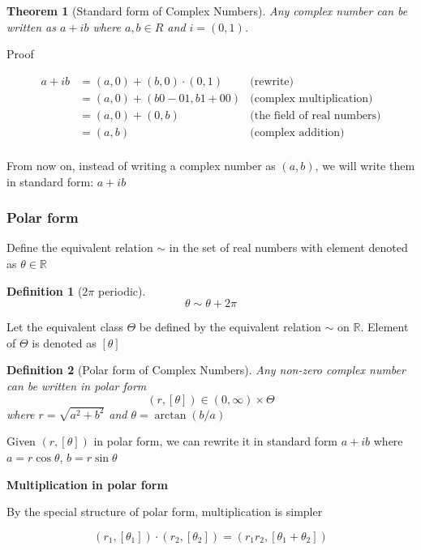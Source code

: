 \documentclass{article}
\newtheorem{theorem}{Theorem}
\newtheorem{definition}{Definition}
\begin{document}
\begin{theorem}[Standard form of Complex Numbers]
    Any complex number can be written as $a + ib$ where $a, b \in R$ and $i = (0, 1)$.
\end{theorem}

Proof

\begin{align*}
    a + ib  &= (a, 0) + (b, 0) \cdot (0, 1) &\text{(rewrite)}\\
            &= (a, 0) + (b 0 - 0 1, b 1 + 0 0) &\text{(complex multiplication)}\\
            &= (a, 0) + (0, b) &\text{(the field of real numbers)}\\
            &= (a, b) &\text{(complex addition)}\\
\end{align*}

From now on, instead of writing a complex number as $(a, b)$, we will write them in standard form: $a + ib$

\subsubsection{Polar form}

Define the equivalent relation $\sim$ in the set of real numbers with element denoted as $\theta \in \mathbb{R}$

\begin{definition}[$2\pi$ periodic]
$$
    \theta \sim \theta + 2\pi 
$$
\end{definition}

Let the equivalent class $\Theta$ be defined by the equivalent relation $\sim$ on $\mathbb{R}$. Element of $\Theta$ is denoted as $[\theta]$

\begin{definition}[Polar form of Complex Numbers]
    Any non-zero complex number can be written in polar form
$$
    (r, [\theta]) \in (0, \infty) \times \Theta
$$
    where $r = \sqrt{a^2 + b^2}$ and $\theta = \arctan (b/a)$
\end{definition}

Given $(r, [\theta])$ in polar form, we can rewrite it in standard form $a + ib$ where $a = r \cos \theta$, $b = r \sin \theta$


\textbf{Multiplication in polar form}

By the special structure of polar form, multiplication is simpler

$$
    (r_1, [\theta_1]) \cdot (r_2, [\theta_2]) = (r_1 r_2, [\theta_1 + \theta_2])
$$
\end{document}
